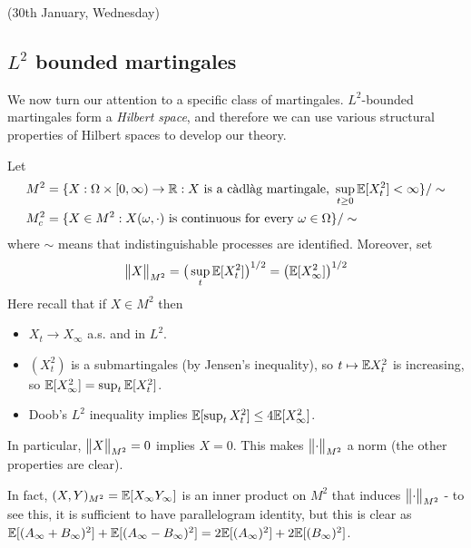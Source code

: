 \documentclass[12pt,a4paper]{article}
\renewenvironment{i}
{\begin{itemize} 
	}%
	{\end{itemize}
}
\begin{document}
(30th January, Wednesday)

\subsection{$L^2$ bounded martingales}

We now turn our attention to a specific class of martingales. $L^2$-bounded martingales form a \emph{Hilbert space}, and therefore we can use various structural properties of Hilbert spaces to develop our theory.
\s

 Let 
\begin{align*}
&M^2 = \{X : \Omega \times [0, \infty) \rightarrow \mathbb{R} : X \text{ is a c\`adl\`ag martingale, }\sup_{t\geq 0} \mathbb{E} [X_t^2] < \infty \} / \sim \\
&M_c^2 = \{X \in M^2 : X(\omega, \cdot) \text{ is continuous for every }\omega \in \Omega \} / \sim
\end{align*}
where $\sim$ means that indistinguishable processes are identified. Moreover, set
\begin{align*}
\bigl\lVert X\bigr\rVert_{M^2} = \big( \sup_t \mathbb{E}[X_t^2] \big)^{1/2} = \big(\mathbb{E}[X_{\infty}^2] \big)^{1/2}
\end{align*}
Here recall that if $X\in M^2$ then
\begin{i}
\item $X_t \rightarrow X_{\infty}$ a.s. and in $L^2$.
\item $(X_t^2)$ is a submartingales (by Jensen's inequality), so $t\mapsto \mathbb{E} X_t^2$ is increasing, so $\mathbb{E}[X_{\infty}^2] = \sup_t \mathbb{E} [X_t^2]$.
\item Doob's $L^2$ inequality implies $\mathbb{E}[\sup_t X_t^2] \leq 4 \mathbb{E} [X_{\infty}^2]$.
\end{i}
In particular, $\bigl\lVert X\bigr\rVert_{M^2}=0$ implies $X=0$. This makes $\bigl\lVert\cdot\bigr\rVert_{M^2}$ a norm (the other properties are clear).

\quad In fact, $(X, Y)_{M^2} = \mathbb{E}[X_{\infty}Y_{\infty}]$ is an inner product on $M^2$ that induces $\bigl\lVert\cdot\bigr\rVert_{M^2}$ - to see this, it is sufficient to have parallelogram identity, but this is clear as $\mathbb{E}[(A_{\infty} + B_{\infty})^2] + \mathbb{E}[(A_{\infty} - B_{\infty})^2] = 2\mathbb{E}[(A_{\infty})^2] + 2\mathbb{E}[(B_{\infty})^2]$. 
\s
\end{document}
